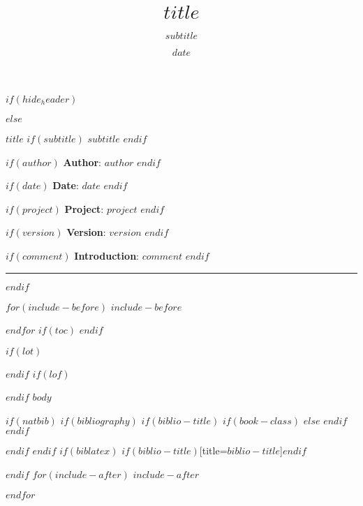 \documentclass[$if(fontsize)$$fontsize$,$endif$$if(lang)$$lang$,$endif$$if(papersize)$$papersize$,$endif$$for(classoption)$$classoption$$sep$,$endfor$]{$documentclass$}
\title{$title$}
\title{}
\subtitle{$subtitle$}
\author{}
\date{$date$}
\date{}
\newcommand{\doctitle}{}
\renewcommand{\doctitle}{\textbf{$title$}}
\begin{document}
\thispagestyle{firstpage}

$if(hide_header)$

$else$

{\Large \noindent \doctitle}
$if(subtitle)$
{\large $subtitle$}
$endif$

$if(author)$
\noindent \textbf{Author}: $author$
$endif$

$if(date)$
\noindent \textbf{Date}: $date$ 
$endif$

$if(project)$
\noindent \textbf{Project}: $project$ 
$endif$

$if(version)$
\noindent \textbf{Version}: $version$
$endif$

$if(comment)$
\noindent \textbf{Introduction}: $comment$ 
$endif$

\noindent \vskip 0.4cm \hrule
$endif$

$for(include-before)$
$include-before$

$endfor$
$if(toc)$
{
\hypersetup{linkcolor=$if(toccolor)$$toccolor$$else$black$endif$}
\setcounter{tocdepth}{$toc-depth$}
\tableofcontents
}
$endif$

$if(lot)$
\listoftables
$endif$
$if(lof)$
\listoffigures
$endif$
$body$

$if(natbib)$
$if(bibliography)$
$if(biblio-title)$
$if(book-class)$
\renewcommand\bibname{$biblio-title$}
$else$
\renewcommand\refname{$biblio-title$}
$endif$
$endif$


$endif$
$endif$
$if(biblatex)$
\printbibliography$if(biblio-title)$[title=$biblio-title$]$endif$

$endif$
$for(include-after)$
$include-after$

$endfor$
\end{document}
